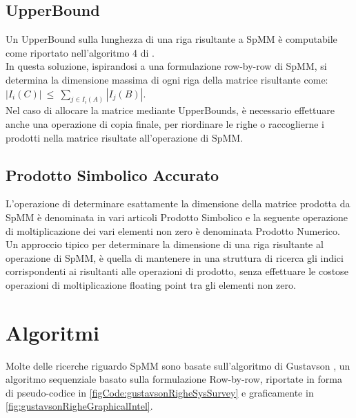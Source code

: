 \subsection{UpperBound}	\label{ChExistingTecqs:symbUpperBound}
Un UpperBound sulla lunghezza di una riga risultante a SpMM è computabile come riportato nell'algoritmo 4 di \cite{sysReviewChi}.\\
In questa soluzione, ispirandosi a una formulazione row-by-row di SpMM, 
si determina la dimensione massima di ogni riga della matrice risultante come:\\
$ | I_i(C) |~\leq~\sum\limits_{ j \in I_i(A) }  | I_j(B) | $.\\
Nel caso di allocare la matrice mediante UpperBounds, è necessario effettuare anche una operazione di copia finale,
per riordinare le righe o raccoglierne i \nnz prodotti nella matrice risultate all'operazione di SpMM.\\

\subsection{Prodotto Simbolico Accurato}
L'operazione di determinare esattamente la dimensione della matrice prodotta da SpMM
è denominata in vari articoli Prodotto Simbolico e 
la seguente operazione di moltiplicazione dei vari elementi non zero è denominata Prodotto Numerico.\\

Un approccio tipico per determinare la dimensione di una riga risultante al operazione di SpMM, 
è quella di mantenere in una struttura di ricerca gli indici corrispondenti 
ai \nnz risultanti alle operazioni di prodotto, senza effettuare le costose 
operazioni di moltiplicazione floating point tra gli elementi non zero.\\

\section{Algoritmi}
Molte delle ricerche riguardo SpMM sono basate sull'algoritmo di Gustavson \cite{gustavson},
un algoritmo sequenziale basato sulla formulazione Row-by-row, riportate in forma di pseudo-codice 
in \ref{figCode:gustavsonRigheSysSurvey} e graficamente in \ref{fig:gustavsonRigheGraphicalIntel}.\\

